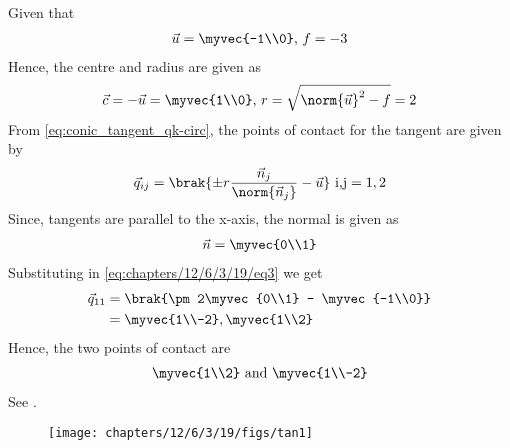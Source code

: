Given that 
\begin{align}
	\vec{u} = \myvec{-1\\0},\,
	f = -3
\end{align}
Hence, the centre and radius are given as
\begin{align}
	\vec{c} = -\vec{u} = \myvec{1\\0},\,
	r = \sqrt{\norm{\vec{u}}^2 - f}
	  = 2
\end{align}
From \eqref{eq:conic_tangent_qk-circ},
the points of contact for the tangent are given by
\begin{align}
	\label{eq:chapters/12/6/3/19/eq3}
	\vec{q}_{ij} = \brak{\pm r\frac{\vec{n}_j}{\norm{\vec{n}_j}}-\vec{u}} \text{ i,j} = 1,2
\end{align}
Since, tangents are parallel to the x-axis, the normal is given as
\begin{align}
	\vec{n} = \myvec{0\\1}
\end{align}
Substituting in \eqref{eq:chapters/12/6/3/19/eq3} we get
\begin{align}
	\vec{q}_{11} &= \brak{\pm 2\myvec{0\\1} - \myvec{-1\\0}}\\
	&= \myvec{1\\-2},\myvec{1\\2}
\end{align}
Hence, the two points of contact are
\begin{align}
	\myvec{1\\2} \text{ and } \myvec{1\\-2}
\end{align}
See .
\begin{figure}[H]
	\begin{center} 
	    \texttt{[image: chapters/12/6/3/19/figs/tan1]}
	\end{center}
\caption{}
\label{fig:chapters/12/6/3/19/Fig1}
\end{figure}





















